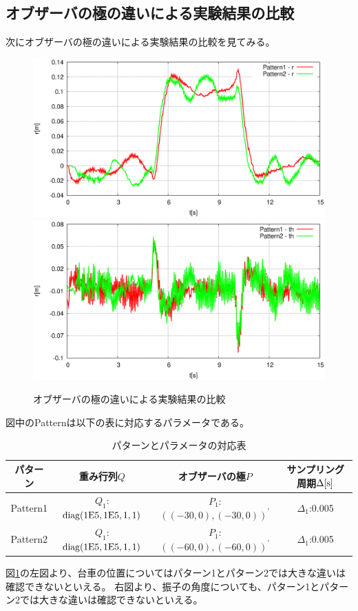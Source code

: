 	\subsection{オブザーバの極の違いによる実験結果の比較}
	次にオブザーバの極の違いによる実験結果の比較を見てみる。
	\begin{figure}[H]
		\centering
		\includegraphics[width=0.49\linewidth]{gazo/Compare_obs_R2.eps}
		\includegraphics[width=0.49\linewidth]{gazo/Compare_obs_TH2.eps}
		\caption{オブザーバの極の違いによる実験結果の比較}
		\label{image:comp_obs}
	\end{figure}
	図中のPatternは以下の表に対応するパラメータである。
	\begin{table}[H]
		\begin{center}
			\caption{パターンとパラメータの対応表}
			\medskip
			
			\begin{tabular}{|c|c|c|c|}\hline
				パターン & 重み行列$Q$ & オブザーバの極$P$ & サンプリング周期$\Delta[\rm{s}]$ \\ \hline\hline
				Pattern1 & $Q_1$:$\rm{diag}(1E5,1E5,1,1)$ & $P_1$:$((-30,0),(-30,0))^{'}$ & $\Delta_1$:0.005 \\ \hline
				Pattern2 & $Q_1$:$\rm{diag}(1E5,1E5,1,1)$ & $P_1$:$((-60,0),(-60,0))^{'}$ & $\Delta_1$:0.005 \\ \hline
			\end{tabular}
		\end{center}
		\label{table:huriage_control}
	\end{table}
	図\ref{image:comp_obs}の左図より、台車の位置についてはパターン1とパターン2では大きな違いは確認できないといえる。
	右図より、振子の角度についても、パターン1とパターン2では大きな違いは確認できないといえる。
	\newpage
